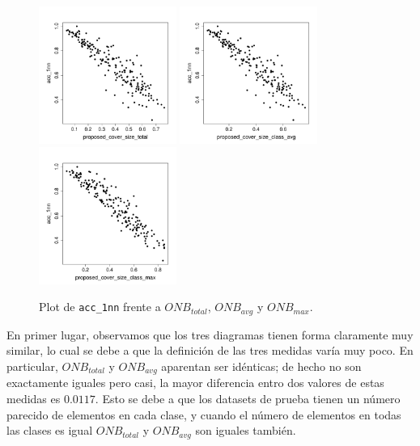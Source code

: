 \documentclass[a4paper,12pt]{report}
\theoremstyle{definition}
\begin{document}
\begin{figure}[H]
  \centering
  \includegraphics[width=0.4\textwidth]{plots/proposed/1nn_vs_proposed_cover_size_total}
  \includegraphics[width=0.4\textwidth]{plots/proposed/1nn_vs_proposed_cover_size_class_avg}
  \includegraphics[width=0.4\textwidth]{plots/proposed/1nn_vs_proposed_cover_size_class_max}
  \caption{Plot de \texttt{acc\_1nn} frente a $ONB_{total}$, $ONB_{avg}$ y $ONB_{max}$.}
  \label{fig:onb}
\end{figure}

En primer lugar, observamos que los tres diagramas tienen forma claramente muy similar, lo cual se debe a que la definición de las tres medidas varía muy poco. En particular, $ONB_{total}$ y $ONB_{avg}$ aparentan ser idénticas; de hecho no son exactamente iguales pero casi,
la mayor diferencia entro dos valores de estas medidas es $0.0117$. Esto se debe a que los datasets de prueba tienen un número parecido de elementos en cada clase, y cuando el número de elementos en todas las clases es igual $ONB_{total}$ y $ONB_{avg}$ son iguales también.
\end{document}
